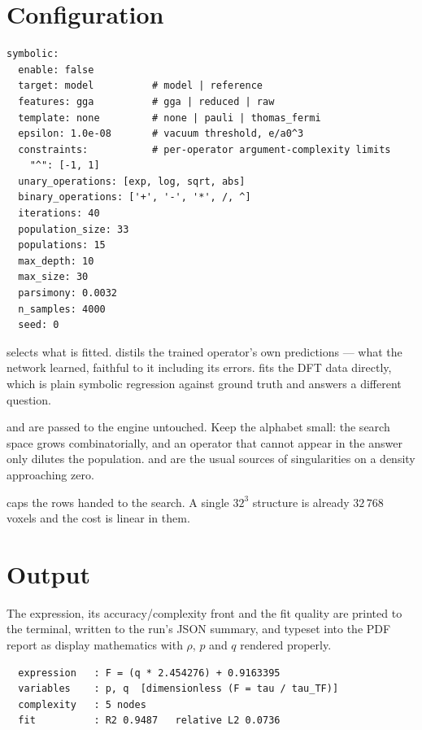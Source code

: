 \section{Configuration}

\begin{lstlisting}
symbolic:
  enable: false
  target: model          # model | reference
  features: gga          # gga | reduced | raw
  template: none         # none | pauli | thomas_fermi
  epsilon: 1.0e-08       # vacuum threshold, e/a0^3
  constraints:           # per-operator argument-complexity limits
    "^": [-1, 1]
  unary_operations: [exp, log, sqrt, abs]
  binary_operations: ['+', '-', '*', /, ^]
  iterations: 40
  population_size: 33
  populations: 15
  max_depth: 10
  max_size: 30
  parsimony: 0.0032
  n_samples: 4000
  seed: 0
\end{lstlisting}

 selects what is fitted.  distils the trained operator's
own predictions --- what the network learned, faithful to it including its
errors.  fits the DFT data directly, which is plain symbolic
regression against ground truth and answers a different question.

 and  are passed to the engine
untouched. Keep the alphabet small: the search space grows combinatorially, and
an operator that cannot appear in the answer only dilutes the population.
\opt{/} and  are the usual sources of singularities on a density
approaching zero.

 caps the rows handed to the search. A single $32^3$ structure
is already $32\,768$ voxels and the cost is linear in them.

\section{Output}

The expression, its accuracy/complexity front and the fit quality are printed
to the terminal, written to the run's JSON summary, and typeset into the PDF
report as display mathematics with $\rho$, $p$ and $q$ rendered properly.

\begin{lstlisting}
  expression   : F = (q * 2.454276) + 0.9163395
  variables    : p, q  [dimensionless (F = tau / tau_TF)]
  complexity   : 5 nodes
  fit          : R2 0.9487   relative L2 0.0736
\end{lstlisting}

